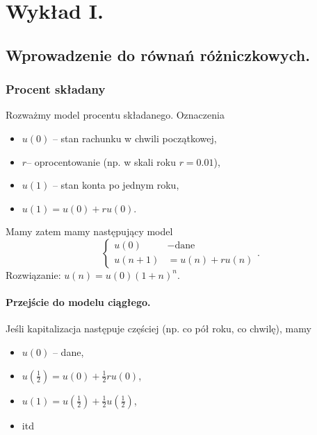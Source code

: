 \chapter{Wykład I.}

\section{Wprowadzenie do równań różniczkowych.}

\subsection{Procent składany}
Rozważmy model procentu składanego. Oznaczenia
\begin{itemize}
	\item $u\left( 0 \right) $ -- stan rachunku w chwili początkowej,
	\item $r$-- oprocentowanie (np. w skali roku $r = 0.01$),
	\item $u\left( 1 \right) $ -- stan konta po jednym roku,
	\item $u\left( 1 \right) = u\left( 0 \right) + ru\left( 0 \right) $.
\end{itemize}
Mamy zatem mamy następujący model
\[
\begin{cases}
	u\left( 0 \right) &- \text{dane}\\
	u\left( n+1 \right) &= u\left( n \right) + ru\left( n \right)  
\end{cases}
.\] 
Rozwiązanie: $u\left( n \right) = u\left( 0 \right) \left( 1 + n \right)^{n}$.

\subsubsection*{Przejście do modelu ciągłego.}

Jeśli kapitalizacja następuje częściej (np. co pół roku, co chwilę), mamy
\begin{itemize}
	\item $u\left( 0 \right) $ -- dane,
	\item $u\left( \tfrac{1}{2} \right) = u\left( 0 \right) + \tfrac{1}{2}ru\left( 0 \right) $,
	\item $u\left( 1 \right) = u\left( \tfrac{1}{2} \right) + \tfrac{1}{2}u\left( \tfrac{1}{2} \right)$,
	\item itd
\end{itemize}

